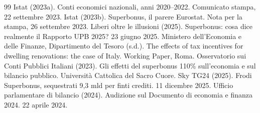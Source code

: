 \documentclass[11pt,a4paper]{article}
\begin{document}
\begin{thebibliography}{99}
 Istat (2023a). Conti economici nazionali, anni 2020--2022. Comunicato stampa, 22 settembre 2023.
 Istat (2023b). Superbonus, il parere Eurostat. Nota per la stampa, 26 settembre 2023.
 Liberi oltre le illusioni (2025). Superbonus: cosa dice realmente il Rapporto UPB 2025? 23 giugno 2025.
 Ministero dell'Economia e delle Finanze, Dipartimento del Tesoro (s.d.). The effects of tax incentives for dwelling renovations: the case of Italy. Working Paper, Roma.
 Osservatorio sui Conti Pubblici Italiani (2023). Gli effetti del superbonus 110\% sull'economia e sul bilancio pubblico. Università Cattolica del Sacro Cuore.
 Sky TG24 (2025). Frodi Superbonus, sequestrati 9,3 mld per finti crediti. 11 dicembre 2025.
 Ufficio parlamentare di bilancio (2024). Audizione sul Documento di economia e finanza 2024. 22 aprile 2024.
\end{thebibliography}
\end{document}
